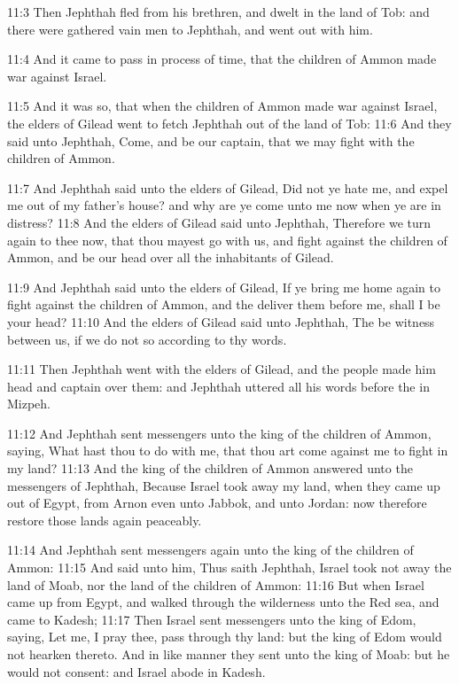 11:3 Then Jephthah fled from his brethren, and dwelt in the land of Tob: and there were gathered vain men to Jephthah, and went out with him.

11:4 And it came to pass in process of time, that the children of Ammon made war against Israel.

11:5 And it was so, that when the children of Ammon made war against Israel, the elders of Gilead went to fetch Jephthah out of the land of Tob: 11:6 And they said unto Jephthah, Come, and be our captain, that we may fight with the children of Ammon.

11:7 And Jephthah said unto the elders of Gilead, Did not ye hate me, and expel me out of my father's house? and why are ye come unto me now when ye are in distress?  11:8 And the elders of Gilead said unto Jephthah, Therefore we turn again to thee now, that thou mayest go with us, and fight against the children of Ammon, and be our head over all the inhabitants of Gilead.

11:9 And Jephthah said unto the elders of Gilead, If ye bring me home again to fight against the children of Ammon, and the \LORD deliver them before me, shall I be your head?  11:10 And the elders of Gilead said unto Jephthah, The \LORD be witness between us, if we do not so according to thy words.

11:11 Then Jephthah went with the elders of Gilead, and the people made him head and captain over them: and Jephthah uttered all his words before the \LORD in Mizpeh.

11:12 And Jephthah sent messengers unto the king of the children of Ammon, saying, What hast thou to do with me, that thou art come against me to fight in my land?  11:13 And the king of the children of Ammon answered unto the messengers of Jephthah, Because Israel took away my land, when they came up out of Egypt, from Arnon even unto Jabbok, and unto Jordan: now therefore restore those lands again peaceably.

11:14 And Jephthah sent messengers again unto the king of the children of Ammon: 11:15 And said unto him, Thus saith Jephthah, Israel took not away the land of Moab, nor the land of the children of Ammon: 11:16 But when Israel came up from Egypt, and walked through the wilderness unto the Red sea, and came to Kadesh; 11:17 Then Israel sent messengers unto the king of Edom, saying, Let me, I pray thee, pass through thy land: but the king of Edom would not hearken thereto.  And in like manner they sent unto the king of Moab: but he would not consent: and Israel abode in Kadesh.

